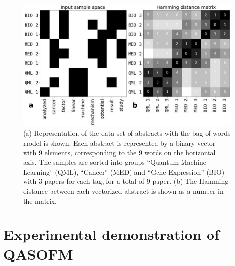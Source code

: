 \documentclass[pra,showkeys,twocolumn,showpacs]{revtex4-1}
\begin{document}




\begin{figure}[t]
	\includegraphics[width=0.95\columnwidth]{vectorized_sample.png}
	\caption{
		(a) Representation of the data set of abstracts with the bag-of-words \cite{weikang2016} model is shown.
		Each abstract is represented by a binary vector with 9 elements, corresponding to the 9 words on the horizontal axis.
		The samples are sorted into groups ``Quantum Machine Learning'' (QML), ``Cancer'' (MED) and ``Gene Expression'' (BIO) with 3 papers for each tag, for a total of 9 paper.
		(b) The Hamming distance between each vectorized abstract is shown as a number in the matrix.
	}
	\label{fig:vectorized_sample}
\end{figure}



















\section{Experimental demonstration of QASOFM}
\end{document}
